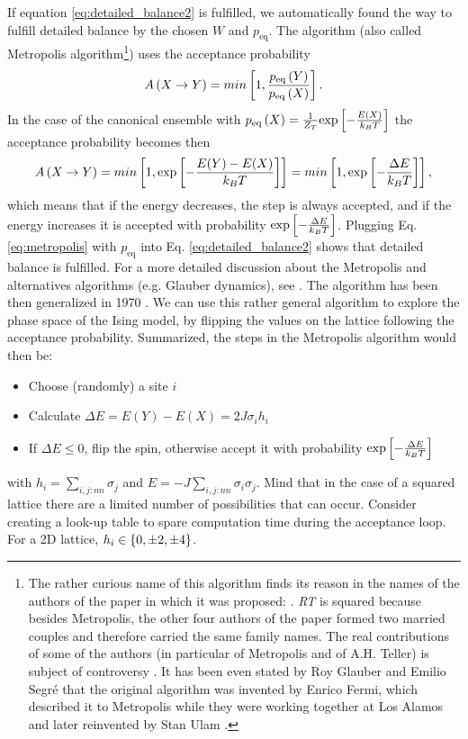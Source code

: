If equation \eqref{eq:detailed_balance2} is fulfilled, we automatically found the way to fulfill detailed balance by the chosen $W$ and $p_{	\text{eq}}$. The algorithm (also called Metropolis algorithm\footnote{The rather curious name of this algorithm finds its reason in the names of the authors of the paper in which it was proposed: \citet{mrtrt}. \emph{RT} is squared because besides Metropolis, the other four authors of the paper formed two married couples and therefore carried the same family names. The real contributions of some of the authors (in particular of Metropolis and of A.H. Teller) is subject of controversy \citep{controversymrtrt,controversymrtrt2}. It has been even stated by Roy Glauber and Emilio Segr\'e that the original algorithm was invented by Enrico Fermi, which described it to Metropolis while they were working together at Los Alamos and later reinvented by Stan Ulam \citep{segre}.}) uses the acceptance probability 
\begin{equation}
A\left(X\rightarrow Y\right) = min\left[1,\frac{p_{	\text{eq}}\left(Y\right)}{p_{	\text{eq}}\left(X\right)}\right].
\label{eq:metropolis}
\end{equation}
In the case of the canonical ensemble with $p_{	\text{eq}}\left(X\right) = \frac{1}{Z_T}\text{exp}\left[-\frac{E(X)}{k_BT}\right] $ the acceptance probability becomes then
\begin{equation}
A\left(X\rightarrow Y\right) = min\left[1,\text{exp}\left[-\frac{E(Y)-E(X)}{k_BT}\right] \right]=min\left[1,\text{exp}\left[-\frac{\Delta E}{k_BT}\right] \right],
\end{equation}
which means that if the energy decreases, the step is always accepted, and if the energy increases it is accepted with probability $\text{exp}\left[-\frac{\Delta E}{k_BT}\right]$. Plugging Eq. \eqref{eq:metropolis} with $p_{	\text{eq}}$ into Eq. \eqref{eq:detailed_balance2} shows that detailed balance is fulfilled. For a more detailed discussion about the Metropolis and alternatives algorithms (e.g. Glauber dynamics), see \citet{comp_phys}. The algorithm has been then generalized in 1970 \citep{mrtrtgeneral}.
We can use this rather general algorithm to explore the phase space of the Ising model, by flipping the values on the lattice following the acceptance probability. Summarized, the steps in the Metropolis algorithm would then be:

\begin{itemize}
\item Choose (randomly) a site $i$
\item Calculate $\Delta E=E(Y)-E(X)=2J\sigma_i h_i$
\item If $\Delta E\leq0$, flip the spin, otherwise accept it with probability $\text{exp}\left[-\frac{\Delta E}{k_BT}\right]$
\end{itemize}
with $h_i=\sum_{i,j:nn}{\sigma_j}$ and $E=-J\sum_{i,j:nn}{\sigma_i\sigma_j}$. Mind that in the case of a squared lattice there are a limited number of possibilities that can occur. Consider creating a look-up table to spare computation time during the acceptance loop. For a 2D lattice, $h_i \in \left\{0, \pm 2, \pm 4\right\}$.
 
